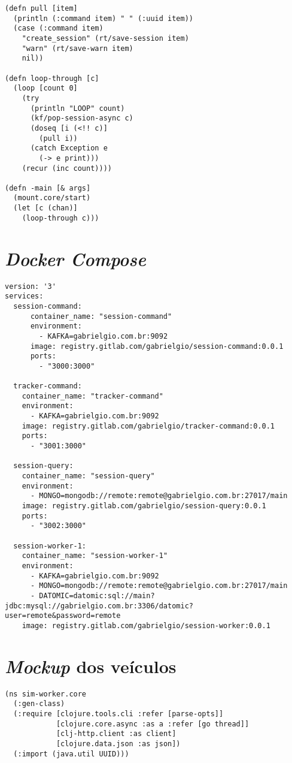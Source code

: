 \begin{apendicesenv}
\begin{lstlisting}
(defn pull [item]
  (println (:command item) " " (:uuid item))
  (case (:command item)
    "create_session" (rt/save-session item)
    "warn" (rt/save-warn item)
    nil))

(defn loop-through [c]
  (loop [count 0]
    (try
      (println "LOOP" count)
      (kf/pop-session-async c)
      (doseq [i (<!! c)]
        (pull i))
      (catch Exception e
        (-> e print)))
    (recur (inc count))))

(defn -main [& args]
  (mount.core/start)
  (let [c (chan)]
    (loop-through c)))
\end{lstlisting}

\chapter{\textit{Docker Compose}}
\label{ap:dockercompose}
\begin{lstlisting}
version: '3'
services:
  session-command:
      container_name: "session-command"
      environment:
        - KAFKA=gabrielgio.com.br:9092
      image: registry.gitlab.com/gabrielgio/session-command:0.0.1
      ports:
        - "3000:3000"

  tracker-command:
    container_name: "tracker-command"
    environment:
      - KAFKA=gabrielgio.com.br:9092
    image: registry.gitlab.com/gabrielgio/tracker-command:0.0.1
    ports:
      - "3001:3000"

  session-query:
    container_name: "session-query"
    environment:
      - MONGO=mongodb://remote:remote@gabrielgio.com.br:27017/main
    image: registry.gitlab.com/gabrielgio/session-query:0.0.1
    ports:
      - "3002:3000"

  session-worker-1:
    container_name: "session-worker-1"
    environment:
      - KAFKA=gabrielgio.com.br:9092
      - MONGO=mongodb://remote:remote@gabrielgio.com.br:27017/main
      - DATOMIC=datomic:sql://main?jdbc:mysql://gabrielgio.com.br:3306/datomic?user=remote&password=remote
    image: registry.gitlab.com/gabrielgio/session-worker:0.0.1
\end{lstlisting}
\chapter{\textit{Mockup} dos veículos}
\label{ap:mockveiculos}
\begin{lstlisting}
(ns sim-worker.core
  (:gen-class)
  (:require [clojure.tools.cli :refer [parse-opts]]
            [clojure.core.async :as a :refer [go thread]]
            [clj-http.client :as client]
            [clojure.data.json :as json])
  (:import (java.util UUID)))


\end{lstlisting}
\end{apendicesenv}
